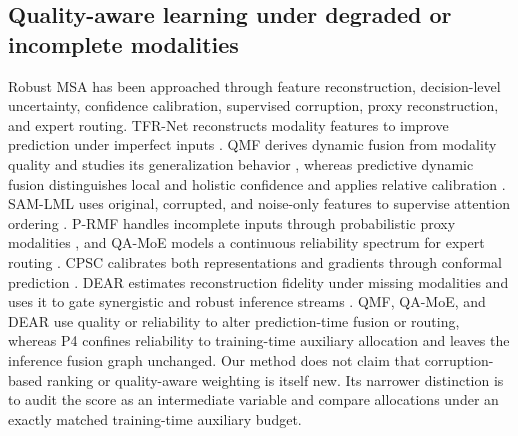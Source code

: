 \subsection{Quality-aware learning under degraded or incomplete
modalities}\label{quality-aware-learning-under-degraded-or-incomplete-modalities}

Robust MSA has been approached through feature reconstruction,
decision-level uncertainty, confidence calibration, supervised
corruption, proxy reconstruction, and expert routing. TFR-Net
reconstructs modality features to improve prediction under imperfect
inputs \cite{yuan2021transformer}. QMF derives dynamic fusion from
modality quality and studies its generalization behavior
\cite{zhang2023qmf}, whereas predictive dynamic fusion distinguishes
local and holistic confidence and applies relative calibration
\cite{cao2024pdf}. SAM-LML uses original, corrupted, and noise-only
features to supervise attention ordering \cite{mai2025samlml}. P-RMF
handles incomplete inputs through probabilistic proxy modalities
\cite{zhu2025prmf}, and QA-MoE models a continuous reliability spectrum
for expert routing \cite{zhu2026qamoe}. CPSC calibrates both
representations and gradients through conformal prediction
\cite{jiang2026cpsc}. DEAR estimates reconstruction fidelity under missing
modalities and uses it to gate synergistic and robust inference streams
\cite{zou2026dear}. QMF, QA-MoE, and DEAR use quality or reliability to
alter prediction-time fusion or routing, whereas P4 confines
reliability to training-time auxiliary allocation and leaves the
inference fusion graph unchanged. Our method does not claim that
corruption-based ranking or quality-aware weighting is itself new. Its narrower
distinction is to audit the score as an intermediate variable and
compare allocations under an exactly matched training-time auxiliary
budget.

